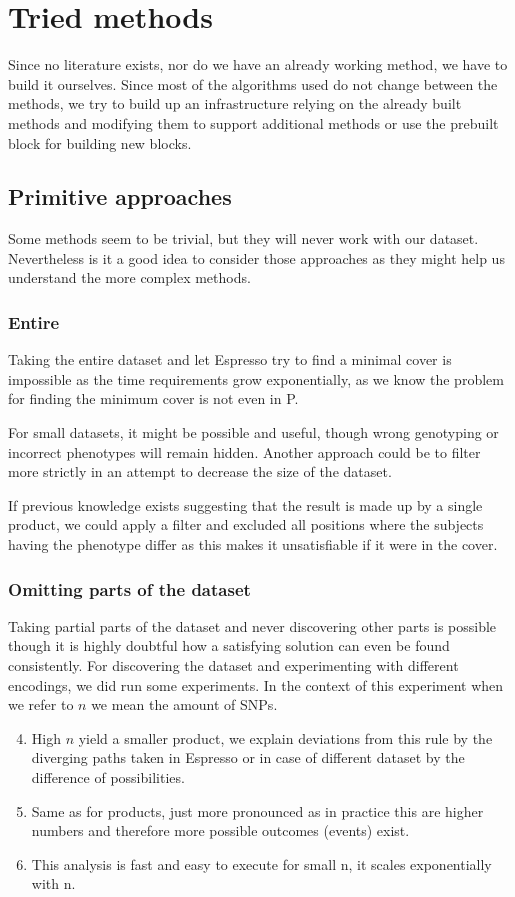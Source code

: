 \documentclass[letterpaper, 11pt]{article}
\begin{document}
\section{ Tried methods}
Since no literature exists, nor do we have an already working method, we have to build it ourselves. Since most of the algorithms used do not change between the methods, we try to build up an infrastructure relying on the already built methods and modifying them to support additional methods or use the prebuilt block for building new blocks. 
\subsection{Primitive approaches}
Some methods seem to be trivial, but they will never work with our dataset. Nevertheless is it a good idea to consider those approaches as they might help us understand the more complex methods.
\subsubsection{Entire}
Taking the entire dataset and let Espresso try to find a minimal cover is impossible as the time requirements grow exponentially, as we know the problem for finding the minimum cover is not even in P. 

For small datasets, it might be possible and useful, though wrong genotyping or incorrect phenotypes will remain hidden. Another approach could be to filter more strictly in an attempt to decrease the size of the dataset.  

If previous knowledge exists suggesting that the result is made up by a single product, we could apply a filter and excluded all positions where the subjects having the phenotype differ as this makes it unsatisfiable if it were in the cover. 
\subsubsection{Omitting parts of the dataset}
\label{sec:omit}
Taking partial parts of the dataset and never discovering other parts is possible though it is highly doubtful how a satisfying solution can even be found consistently. For discovering the dataset and experimenting with different encodings, we did run some experiments. In the context of this experiment when we refer to $n$ we mean the amount of SNPs. 

\begin{enumerate} 
\setcounter{enumi}{3}
\item High $n$ yield a smaller product, we explain deviations from this rule by the diverging paths taken in Espresso or in case of different dataset by the difference of possibilities. 
\item Same as for products, just more pronounced as in practice this are higher numbers and therefore more possible outcomes (events) exist. 
\item This analysis is fast and easy to execute for small n, it scales exponentially with n. 
\end{enumerate}
\end{document}
